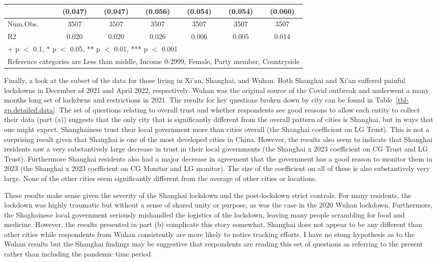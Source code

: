 \documentclass[
  letterpaper,
  DIV=11,
  numbers=noendperiod]{scrartcl}
\begin{document}
\begin{table}
\begin{tabular}[t]{lcccccc}
 & (\num{0.047}) & (\num{0.047}) & (\num{0.056}) & (\num{0.054}) & (\num{0.054}) & (\num{0.060})\\
\midrule
Num.Obs. & \num{3507} & \num{3507} & \num{3507} & \num{3507} & \num{3507} & \num{3507}\\
R2 & \num{0.020} & \num{0.020} & \num{0.026} & \num{0.006} & \num{0.005} & \num{0.014}\\
\bottomrule
\multicolumn{7}{l}{\rule{0pt}{1em}+ p $<$ 0.1, * p $<$ 0.05, ** p $<$ 0.01, *** p $<$ 0.001}\\
\multicolumn{7}{l}{\rule{0pt}{1em}Reference categories are Less than middle, Income 0-2999, Female, Party member, Countryside}\\
\end{tabular}
\end{table}

Finally, a look at the subset of the data for those living in Xi'an,
Shanghai, and Wuhan. Both Shanghai and Xi'an suffered painful lockdowns
in December of 2021 and April 2022, respectively. Wuhan was the original
source of the Covid outbreak and underwent a many months long set of
lockdwns and restrictions in 2021. The results for key questions broken
down by city can be found in Table~\ref{tbl-gp.detailed.data}. The set
of questions relating to overall trust and whether respondents see good
reasons to allow each entity to collect their data (part (a)) suggests
that the only city that is significantly different from the overall
pattern of cities is Shanghai, but in ways that one might expect.
Shanghainese trust their local government more than cities overall (the
Shanghai coefficient on LG Trust). This is not a surprising result given
that Shanghai is one of the most developed cities in China. However, the
results also seem to indicate that Shanghai residents saw a very
substantively large decrease in trust in their local governments (the
Shanghai x 2023 coefficient on CG Trust and LG Trust). Furthermore
Shanghai residents also had a major decrease in agreement that the
government has a good reason to monitor them in 2023 (the Shanghai x
2023 coefficient on CG Monitor and LG monitor). The size of the
coefficient on all of these is also substantively very large. None of
the other cities seem significantly different from the average of other
cities or locations.

These results make sense given the severity of the Shanghai lockdown and
the post-lockdown strict controls. For many residents, the lockdown was
highly traumatic but without a sense of shared unity or purpose, as was
the case in the 2020 Wuhan lockdown. Furthermore, the Shaghainese local
government seriously mishandled the logistics of the lockdown, leaving
many people scrambling for food and medicine. However, the results
presented in part (b) complicate this story somewhat. Shanghai does not
appear to be any different than other cities while respondents from
Wuhan consistently are more likely to notice tracking efforts. I have no
stong hypothesis as to the Wuhan results but the Shanghai findings may
be suggestive that respondents are reading this set of questions as
referring to the present rather than including the pandemic time period.
\end{document}
